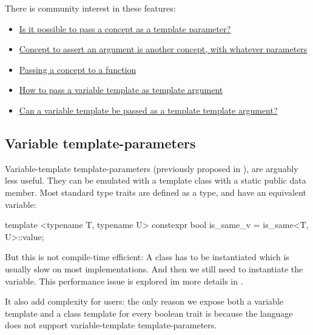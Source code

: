 \documentclass{wg21}
\begin{document}
There is community interest in these features:

\begin{itemize}
\item \href{https://stackoverflow.com/questions/63098070/is-it-possible-to-pass-a-concept-as-a-template-parameter}{Is it possible to pass a concept as a template parameter?}
\item \href{https://stackoverflow.com/questions/72488554/concept-to-assert-an-argument-is-another-concept-with-whatever-parameters}{Concept to assert an argument is another concept, with whatever parameters}
\item \href{https://stackoverflow.com/questions/58875829/passing-a-concept-to-a-function}{Passing a concept to a function}
\item \href{https://stackoverflow.com/questions/61664468/how-to-pass-a-variable-template-as-template-argument}{How to pass a variable template as template argument}
\item \href{https://stackoverflow.com/questions/58592312/can-a-variable-template-be-passed-as-a-template-template-argument}{Can a variable template be passed as a template template argument?}
\end{itemize}

\subsection{Variable template-parameters}

Variable-template template-parameters (previously proposed in ), are arguably less useful.
They can be emulated with a template class with a static public  data member.
Most standard type traits are defined as a type, and have an equivalent  variable:
\begin{colorblock}
template <typename T, typename U>
constexpr bool is_same_v = is_same<T, U>::value;
\end{colorblock}

But this is not compile-time efficient: A class has to be instantiated which is usually slow on most implementations.
And then we still need to instantiate the variable. This performance issue is explored  im more details in .

It also add complexity for users: the only reason we expose both a variable template and a class template for every boolean trait is because the language
does not support variable-template template-parameters.
\end{document}
